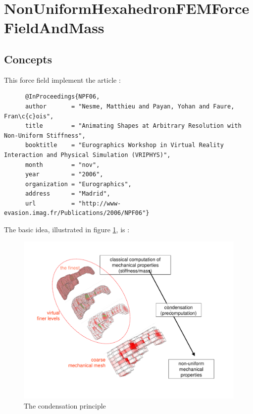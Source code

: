 \section{NonUniformHexahedronFEMForceFieldAndMass}


\subsection{Concepts}

This force field implement the article :

\begin{verbatim}
      @InProceedings{NPF06,
      author       = "Nesme, Matthieu and Payan, Yohan and Faure, Fran\c{c}ois",
      title        = "Animating Shapes at Arbitrary Resolution with Non-Uniform Stiffness",
      booktitle    = "Eurographics Workshop in Virtual Reality Interaction and Physical Simulation (VRIPHYS)",
      month        = "nov",
      year         = "2006",
      organization = "Eurographics",
      address      = "Madrid",
      url          = "http://www-evasion.imag.fr/Publications/2006/NPF06"}
 \end{verbatim}
 
 
 
The basic idea, illustrated in figure \ref{fig:condensation}, is :


\begin{figure}[H]
	\centering
	\includegraphics[width=\linewidth]{condensation}
	\caption{The condensation principle}
	\label{fig:condensation}
\end{figure}



